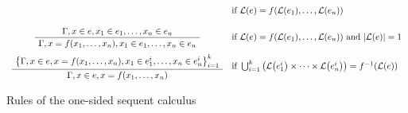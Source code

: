 \begin{table}
\begin{gather*}
\begin{array}{cl}
      &
        \text{if~} \lang{e} = f(\lang{e_1}, \ldots, \lang{e_n})
      \\[3ex]
      \infer
      {\seqq{x = f(x_1, \ldots, x_n), x_1 \in e_1, \ldots, x_n \in e_n}}
      {\seqq{x \in e, x_1 \in e_1, \ldots, x_n \in e_n}}
      &
        \text{if~}
        \lang{e} = f(\lang{e_1}, \ldots, \lang{e_n}) \text{~and~} 
        |\lang{e}|= 1
      \\[3ex]
      \infer
      {\seqq{x \in e, x = f(x_1, \ldots, x_n)}}
      {\big\{\seqq{x \in e, x = f(x_1, \ldots, x_n),
      x_1 \in e_1^i, \ldots, x_n \in e_n^i}\big\}_{i=1}^k}
      &
        \text{if~}
    \bigcup_{i=1}^k \big( \lang{e_1^i} \times \cdots \times \lang{e_n^i} \big) =
    f^{-1}(\lang{e})
    \end{array}
  \end{gather*}
  
  \caption{Rules of the one-sided sequent calculus}
\end{table}


